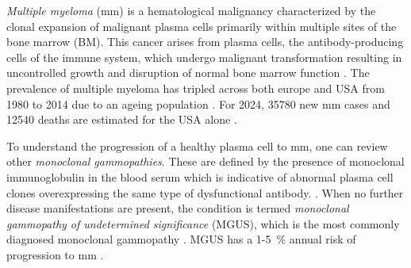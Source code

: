 





%
\label{sec:intro_myeloma}%
\emph{Multiple myeloma} (\ac{mm}) is a hematological malignancy characterized by the
clonal expansion of malignant plasma cells primarily within multiple sites of
the bone marrow (BM). This cancer arises from plasma cells, the
antibody-producing cells of the immune system, which undergo malignant
transformation resulting in uncontrolled growth and disruption of normal bone
marrow function \cite{yangPathogenesisTreatmentMultiple2022}. The prevalence of
multiple myeloma has tripled across both europe and USA from 1980 to 2014 due to
an ageing population \cite{ociasTrendsHematologicalCancer2016,
    turessonRapidlyChangingMyeloma2018}. For 2024, 35780 new \ac{mm} cases and 12540
deaths are estimated for the USA alone \cite{siegelCancerStatistics20242024}.

To understand the progression of a healthy plasma cell to \ac{mm}, one can review
other \emph{monoclonal gammopathies}. These are defined by the presence of
monoclonal immunoglobulin in the blood serum which is indicative of abnormal
plasma cell clones overexpressing the same type of dysfunctional antibody.
\cite{kyleMonoclonalGammopathyUndetermined1997,
    fermandMonoclonalGammopathyClinical2018}. When no further disease manifestations
are present, the condition is termed \emph{monoclonal gammopathy of undetermined
    significance} (MGUS), which is the most commonly diagnosed monoclonal gammopathy
\cite{kyleMonoclonalGammopathyUndetermined1997}. MGUS has a 1-\SI{5}{\percent}
annual risk of progression to \ac{mm} \cite{rajkumarInternationalMyelomaWorking2014}.

